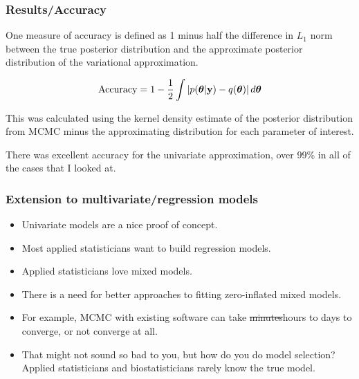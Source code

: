 \documentclass{beamer}
\begin{document}
\begin{frame}
\frametitle{Results/Accuracy}
One measure of accuracy is defined as 1 minus half the difference in $L_1$ norm between the
true posterior distribution and the approximate posterior distribution of the
variational approximation.

$$
\text{Accuracy} = 1 - {\frac{1}{2}} \int \left |p({\boldsymbol \theta}|{\bf y}) - q({\boldsymbol \theta}) \right | d {\boldsymbol \theta}
$$

This was calculated using the kernel density estimate of the posterior
distribution from MCMC minus the approximating distribution for each parameter of
interest.

\bigskip 
There was excellent accuracy for the univariate approximation, over 99\% in all of the cases that I looked at.
\end{frame}

\begin{frame}
\frametitle{Extension to multivariate/regression models}
\begin{itemize}
\item Univariate models are a nice proof of concept.
\item Most applied statisticians want to build regression models.
\item Applied statisticians love mixed models.
\item There is a need for better approaches to fitting zero-inflated mixed models.
\item For example, MCMC with existing software can take \sout{minutes}hours 
to days to converge, or not converge at all.
\item That might not sound so bad to you, but how do you
do model selection? Applied statisticians and biostatisticians rarely know the true model.
\end{itemize}
\end{frame}
\end{document}
